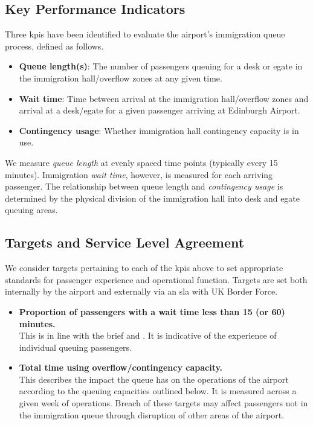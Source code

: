 \documentclass[10pt]{article}
\begin{document}
\subsection{Key Performance Indicators} \label{sec_kpi}

Three \glspl{kpi} have been identified to evaluate the airport's immigration queue process, defined as follows.

\begin{itemize}
    \item \textbf{Queue length(s)}: The number of passengers queuing for a desk or \gls{egate} in the immigration hall/overflow zones at any given time.
    \item \textbf{Wait time}: Time between arrival at the immigration hall/overflow zones and arrival at a desk/\gls{egate} for a given passenger arriving at Edinburgh Airport. 
    \item \textbf{Contingency usage}: Whether immigration hall contingency capacity is in use.
\end{itemize}

We measure \textit{queue length} at evenly spaced time points (typically every 15 minutes). Immigration \textit{wait time}, however, is measured for each arriving passenger. The relationship between queue length and \textit{contingency usage} is determined by the physical division of the immigration hall into desk and \gls{egate} queuing areas.

\subsection{Targets and Service Level Agreement} \label{sec_sla}
We consider targets pertaining to each of the \glspl{kpi} above to set appropriate standards for passenger experience and operational function. Targets are set both internally by the airport and externally via an \gls{sla} with UK Border Force. 
\begin{itemize}
    \item \textbf{Proportion of passengers with a wait time less than 15 (or 60) minutes.} \\
    This is in line with the brief and \cite{UK_border_2025}. It is indicative of the experience of individual queuing passengers.
    \item \textbf{Total time using overflow/contingency capacity.} \\
    This describes the impact the queue has on the operations of the airport according to the queuing capacities outlined below. It is measured across a given week of operations. Breach of these targets may affect passengers not in the immigration queue through disruption of other areas of the airport.
\end{itemize}
\end{document}
